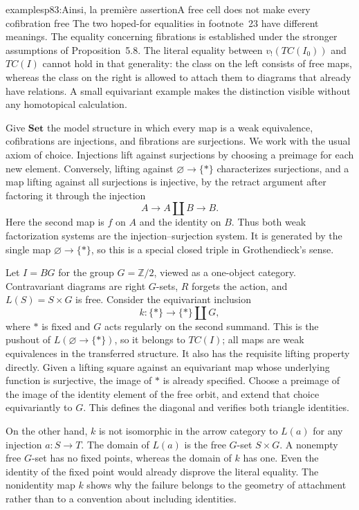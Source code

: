 \begin{dcomment}{examples}{p83:Ainsi, la première assertion}{A free cell does not make every cofibration free}
The two hoped-for equalities in footnote~23 have different meanings. The equality concerning fibrations is established under the stronger assumptions of Proposition~5.8. The literal equality between $v_!(TC(I_0))$ and $TC(I)$ cannot hold in that generality: the class on the left consists of free maps, whereas the class on the right is allowed to attach them to diagrams that already have relations. A small equivariant example makes the distinction visible without any homotopical calculation.

Give $\mathbf{Set}$ the model structure in which every map is a weak equivalence, cofibrations are injections, and fibrations are surjections. We work with the usual axiom of choice. Injections lift against surjections by choosing a preimage for each new element. Conversely, lifting against $\varnothing\to\{*\}$ characterizes surjections, and a map lifting against all surjections is injective, by the retract argument after factoring it through the injection
\[
 A\longrightarrow A\amalg B\longrightarrow B.
\]
Here the second map is $f$ on $A$ and the identity on $B$. Thus both weak factorization systems are the injection--surjection system. It is generated by the single map $\varnothing\to\{*\}$, so this is a special closed triple in Grothendieck's sense.

Let $I=BG$ for the group $G=\mathbb Z/2$, viewed as a one-object category. Contravariant diagrams are right $G$-sets, $R$ forgets the action, and $L(S)=S\times G$ is free. Consider the equivariant inclusion
\[
 k:\{*\}\longrightarrow\{*\}\amalg G,
\]
where $*$ is fixed and $G$ acts regularly on the second summand. This is the pushout of $L(\varnothing\to\{*\})$, so it belongs to $TC(I)$; all maps are weak equivalences in the transferred structure. It also has the requisite lifting property directly. Given a lifting square against an equivariant map whose underlying function is surjective, the image of $*$ is already specified. Choose a preimage of the image of the identity element of the free orbit, and extend that choice equivariantly to $G$. This defines the diagonal and verifies both triangle identities.

On the other hand, $k$ is not isomorphic in the arrow category to $L(a)$ for any injection $a:S\to T$. The domain of $L(a)$ is the free $G$-set $S\times G$. A nonempty free $G$-set has no fixed points, whereas the domain of $k$ has one. Even the identity of the fixed point would already disprove the literal equality. The nonidentity map $k$ shows why the failure belongs to the geometry of attachment rather than to a convention about including identities.


\end{dcomment}
